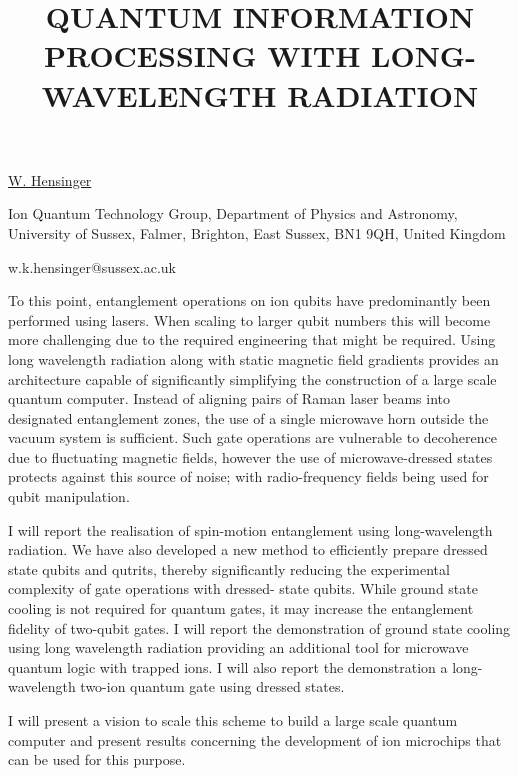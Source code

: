 \title{QUANTUM INFORMATION PROCESSING WITH LONG-WAVELENGTH RADIATION}

\underline{W. Hensinger} 

{\normalsize{\vspace{-4mm}
Ion Quantum Technology Group, Department of Physics and Astronomy,
University of Sussex, Falmer, Brighton, East Sussex, BN1 9QH, United Kingdom

\email w.k.hensinger@sussex.ac.uk}}

To this point, entanglement operations on ion qubits have predominantly been performed using
lasers. When scaling to larger qubit numbers this will become more challenging due to the
required engineering that might be required. Using long wavelength radiation along with static
magnetic field gradients provides an architecture capable of significantly simplifying the
construction of a large scale quantum computer. Instead of aligning pairs of Raman laser beams
into designated entanglement zones, the use of a single microwave horn outside the vacuum
system is sufficient. Such gate operations are vulnerable to decoherence due to fluctuating
magnetic fields, however the use of microwave-dressed states protects against this source of
noise; with radio-frequency fields being used for qubit manipulation.

I will report the realisation of spin-motion entanglement using long-wavelength radiation. We
have also developed a new method to efficiently prepare dressed state qubits and qutrits,
thereby significantly reducing the experimental complexity of gate operations with dressed-
state qubits. While ground state cooling is not required for quantum gates, it may increase the
entanglement fidelity of two-qubit gates. I will report the demonstration of ground state
cooling  using long wavelength radiation providing an additional tool for microwave quantum
logic with trapped ions. I will also report the demonstration a long-wavelength two-ion quantum
gate using dressed states.

I will present a vision to scale this scheme to build a large scale quantum computer and
present results concerning the development of ion microchips that can be used for this purpose.

\vspace{\baselineskip}
